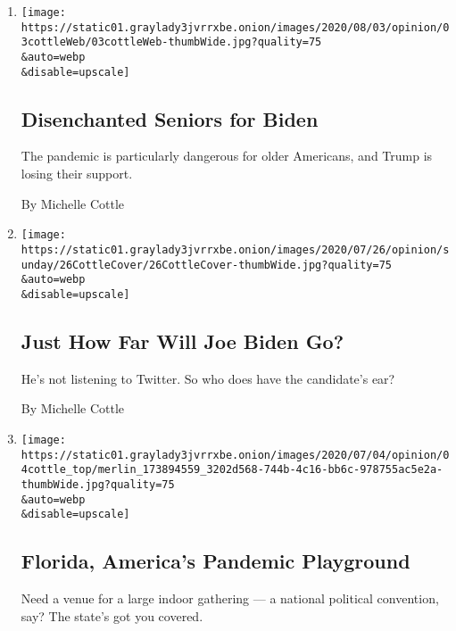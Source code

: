 \begin{enumerate}
\def\labelenumi{\arabic{enumi}.}
\item
  \href{/2020/08/03/opinion/senior-voters-biden-trump-2020.html}{}

  \texttt{[image: https://static01.graylady3jvrrxbe.onion/images/2020/08/03/opinion/03cottleWeb/03cottleWeb-thumbWide.jpg?quality=75\\\&auto=webp\\\&disable=upscale]}

  \hypertarget{disenchanted-seniors-for-biden}{%
  \subsection{Disenchanted Seniors for
  Biden}\label{disenchanted-seniors-for-biden}}

  The pandemic is particularly dangerous for older Americans, and Trump
  is losing their support.

  By Michelle Cottle
\item
  \href{/2020/07/24/opinion/sunday/joe-biden-2020.html}{}

  \texttt{[image: https://static01.graylady3jvrrxbe.onion/images/2020/07/26/opinion/sunday/26CottleCover/26CottleCover-thumbWide.jpg?quality=75\\\&auto=webp\\\&disable=upscale]}

  \hypertarget{just-how-far-will-joe-biden-go}{%
  \subsection{Just How Far Will Joe Biden
  Go?}\label{just-how-far-will-joe-biden-go}}

  He's not listening to Twitter. So who does have the candidate's ear?

  By Michelle Cottle
\item
  \href{/2020/07/02/opinion/coronavirus-florida-reopenings.html}{}

  \texttt{[image: https://static01.graylady3jvrrxbe.onion/images/2020/07/04/opinion/04cottle\_top/merlin\_173894559\_3202d568-744b-4c16-bb6c-978755ac5e2a-thumbWide.jpg?quality=75\\\&auto=webp\\\&disable=upscale]}

  \hypertarget{florida-americas-pandemic-playground}{%
  \subsection{Florida, America's Pandemic
  Playground}\label{florida-americas-pandemic-playground}}

  Need a venue for a large indoor gathering --- a national political
  convention, say? The state's got you covered.


\end{enumerate}
